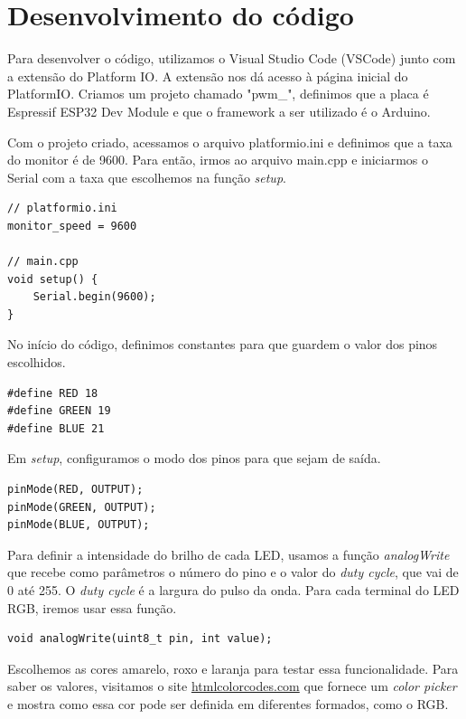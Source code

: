 \section{Desenvolvimento do código}
Para desenvolver o código, utilizamos o Visual Studio Code (VSCode) junto com a extensão do Platform IO. A extensão nos dá acesso à página inicial do PlatformIO. Criamos um projeto chamado "pwm\_", definimos que a placa é Espressif ESP32 Dev Module e que o framework a ser utilizado é o Arduino.

Com o projeto criado, acessamos o arquivo platformio.ini e definimos que a taxa do monitor é de 9600. Para então, irmos ao arquivo main.cpp e iniciarmos o Serial com a taxa que escolhemos na função \textit{setup}.

\begin{lstlisting}
// platformio.ini
monitor_speed = 9600

// main.cpp
void setup() {
    Serial.begin(9600);
}

\end{lstlisting}

No início do código, definimos constantes para que guardem o valor dos pinos escolhidos.

\begin{lstlisting}
#define RED 18
#define GREEN 19
#define BLUE 21
\end{lstlisting}

Em \textit{setup}, configuramos o modo dos pinos para que sejam de saída.

\begin{lstlisting}
pinMode(RED, OUTPUT);
pinMode(GREEN, OUTPUT);
pinMode(BLUE, OUTPUT);
\end{lstlisting}

Para definir a intensidade do brilho de cada LED, usamos a função \textit{analogWrite} que recebe como parâmetros o número do pino e o valor do \textit{duty cycle}, que vai de 0 até 255. O \textit{duty cycle} é a largura do pulso da onda. Para cada terminal do LED RGB, iremos usar essa função.

\begin{lstlisting}
void analogWrite(uint8_t pin, int value);
\end{lstlisting}

Escolhemos as cores amarelo, roxo e laranja para testar essa funcionalidade. Para saber os valores, visitamos o site \href{https://htmlcolorcodes.com/}{htmlcolorcodes.com} que fornece um \textit{color picker} e mostra como essa cor pode ser definida em diferentes formados, como o RGB.

